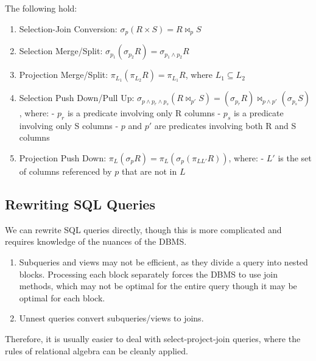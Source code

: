 \documentclass{article}
\begin{document}
    \begin{theorem}[Identities]
      The following hold:
      \begin{enumerate}
        \item Selection-Join Conversion: $\sigma_p(R \times S) = R \bowtie_p S$
        \item Selection Merge/Split: $\sigma_{p_1}(\sigma_{p_2}R) = \sigma_{p_1 \wedge p_2}R$
        \item Projection Merge/Split: $\pi_{L_1}(\pi_{L_2}R) = \pi_{L_1}R$, where $L_1 \subseteq L_2$
        \item Selection Push Down/Pull Up: $\sigma_{p \wedge p_r \wedge p_s}(R \bowtie_{p'} S) = (\sigma_{p_r}R) \bowtie_{p \wedge p'} (\sigma_{p_s}S)$, where:
        - $p_r$ is a predicate involving only R columns
        - $p_s$ is a predicate involving only S columns
        - $p$ and $p'$ are predicates involving both R and S columns
        \item Projection Push Down: $\pi_L(\sigma_p R) = \pi_L(\sigma_p(\pi_{L L'}R))$, where:
        - $L'$ is the set of columns referenced by $p$ that are not in $L$
      \end{enumerate}
    \end{theorem} 

  \subsection{Rewriting SQL Queries}

    \begin{definition}
      We can rewrite SQL queries directly, though this is more complicated and requires knowledge of the nuances of the DBMS. 
      \begin{enumerate}
        \item Subqueries and views may not be efficient, as they divide a query into nested blocks. Processing each block separately forces the DBMS to use join methods, which may not be optimal for the entire query though it may be optimal for each block. 
        \item Unnest queries convert subqueries/views to joins. 
      \end{enumerate}
      Therefore, it is usually easier to deal with select-project-join queries, where the rules of relational algebra can be cleanly applied. 
    \end{definition} 
\end{document}
